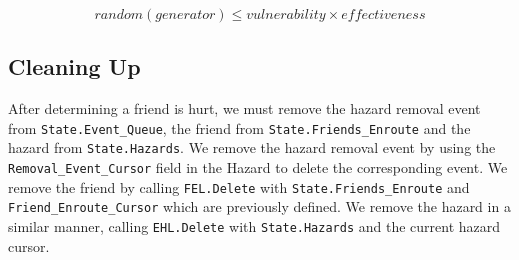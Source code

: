 \documentclass[12pt,letterpaper,titlepage]{article}
\newcommand{\code}[1]{\texttt{#1}}
\begin{document}
\[random(generator) \leq vulnerability \times effectiveness\]

\subsection{Cleaning Up}
After determining a friend is hurt, we must remove the hazard removal
event from \code{State.Event_Queue}, the friend from
\code{State.Friends_Enroute} and the hazard from \code{State.Hazards}.
We remove the hazard removal event by using the
\code{Removal_Event_Cursor} field in the Hazard to delete the
corresponding event.  We remove the friend by calling \code{FEL.Delete}
with \code{State.Friends_Enroute} and \code{Friend_Enroute_Cursor}
which are previously defined.  We remove the hazard in a similar
manner, calling \code{EHL.Delete} with \code{State.Hazards} and the
current hazard cursor.
\end{document}
